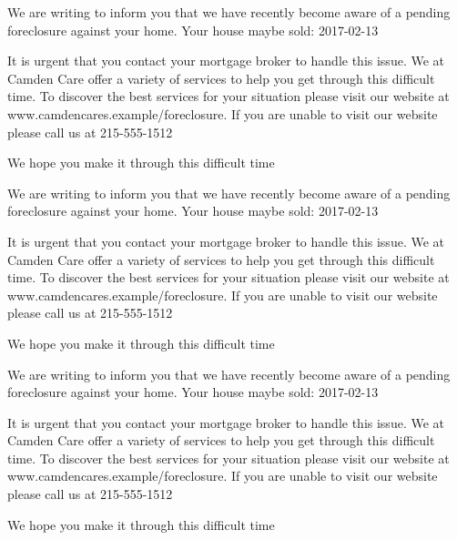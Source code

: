 \documentclass[10pt,stdletter]{newlfm}
\begin{document}
\pagebreak
{}
\begin{newlfm}

We are writing to inform you that we have recently become aware of a pending foreclosure against your home. Your house maybe sold: 2017-02-13

It is urgent that you contact your mortgage broker to handle this issue.
We at Camden Care offer a variety of services to help you get through this difficult time. To discover the best services for your situation please visit our website at www.camdencares.example/foreclosure.
If you are unable to visit our website please call us at 215-555-1512

We hope you make it through this difficult time

\end{newlfm}
\pagebreak
{}
\begin{newlfm}

We are writing to inform you that we have recently become aware of a pending foreclosure against your home. Your house maybe sold: 2017-02-13

It is urgent that you contact your mortgage broker to handle this issue.
We at Camden Care offer a variety of services to help you get through this difficult time. To discover the best services for your situation please visit our website at www.camdencares.example/foreclosure.
If you are unable to visit our website please call us at 215-555-1512

We hope you make it through this difficult time

\end{newlfm}
\pagebreak
{}
\begin{newlfm}

We are writing to inform you that we have recently become aware of a pending foreclosure against your home. Your house maybe sold: 2017-02-13

It is urgent that you contact your mortgage broker to handle this issue.
We at Camden Care offer a variety of services to help you get through this difficult time. To discover the best services for your situation please visit our website at www.camdencares.example/foreclosure.
If you are unable to visit our website please call us at 215-555-1512

We hope you make it through this difficult time

\end{newlfm}
\end{document}
